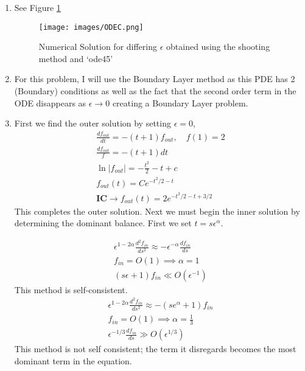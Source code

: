\documentclass{article}
\begin{document}
\begin{enumerate}[label=\alph*.]
    \item See Figure \ref{fig:ODEC_num_sol}
        \begin{figure}[ht]
            \centering
            \texttt{[image: images/ODEC.png]}
            \caption{Numerical Solution for differing $\epsilon$ obtained using
            the shooting method and `ode45'}
            \label{fig:ODEC_num_sol}
        \end{figure}
    \item For this problem, I will use the Boundary Layer method as this PDE has
    2 (Boundary) conditions as well as the fact that the second order term in
    the ODE disappears as $\epsilon \to 0$ creating a Boundary Layer problem.
    \item First we find the outer solution by setting $\epsilon = 0$, 
    \begin{gather*}
        \frac{df_{out}}{dt} = - (t+1)f_{out}, \quad f(1) = 2\\
        \frac{df_{out}}{f} = - (t+1)dt\\
        \ln|f_{out}| = -\frac{t^2}{2} - t + c\\
        f_{out}(t) = Ce^{-t^2/2 - t}\\
        \textbf{IC} \to f_{out}(t) = 2e^{-t^2/2 - t + 3/2}
    \end{gather*}
    This completes the outer solution. Next we must begin the inner solution by
    determining the dominant balance. First we set $t = s\epsilon^{\alpha}$. 

        \begin{gather*}
            \epsilon^{1-2\alpha}\frac{d^2f_{in}}{ds^2} \approx
            -\epsilon^{-\alpha}\frac{df_{in}}{ds} \\
            f_{in} = O(1) \implies \alpha = 1\\
            (s\epsilon + 1)f_{in} \ll O(\epsilon^{-1})
        \end{gather*}
        This method is self-consistent. 
    \emp
        \begin{gather*}
            \epsilon^{1-2\alpha}\frac{d^2f_{in}}{ds^2} \approx
            -(se^{\alpha} +1)f_{in}\\
            f_{in} = O(1) \implies \alpha = \frac{1}{3}\\
            \epsilon^{-1/3}\frac{df_{in}}{ds} \gg O(\epsilon^{1/3})
        \end{gather*}
        This method is not self consistent; the term it disregards becomes the
        most dominant term in the equation. 
    \emp


\end{enumerate}
\end{document}
